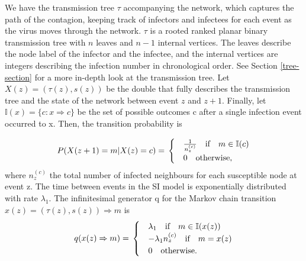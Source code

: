 \documentclass[12pt]{article} %
\numberwithin{equation}{section}
\begin{document}
We have the transmission tree $\tau$ accompanying the network, which captures the path of the contagion, keeping track of infectors and infectees for each event as the virus moves through the network. $\tau$ is a rooted ranked planar binary transmission tree with $n$ leaves and $n-1$ internal vertices. The leaves describe the node label of the infector and the infectee, and the internal vertices are integers describing the infection number in chronological order. See Section \ref{tree-section} for a more in-depth look at the transmission tree. Let $X(z) = (\tau(z),s(z))$ be the double that fully describes the transmission tree and the state of the network between event $z$ and $z+1$. Finally, let $\mathbb{I}(x) = \{c: x \Rightarrow  c\}$ be the set of possible outcomes c after a single infection event occurred to x.  Then, the transition probability is 

\begin{equation} \label{firstP}
P(X(z+1) = m |X(z)= c) = \\
\begin{cases}
& \frac{1}{n_z^{(c)}}  \quad \text{if} \quad m \in \mathbb{I}(c) \\
& 0 \quad \text{otherwise,}
\end{cases}
\end{equation}
where $n_z^{(c)}$ the total number of infected neighbours for each susceptible node at event z. The time between events in the SI model is exponentially distributed with rate $\lambda_1$. The infinitesimal generator q for the Markov chain transition $x(z) = (\tau(z),s(z)) \Rightarrow m$ is
\begin{equation}\label{trans1}
q(x(z) \Rightarrow m) = \\
\begin{cases}
& \lambda_1   \quad \text{if} \quad m \in \mathbb{I}(x(z)) \\ 
& -\lambda_1 n_z^{(c)} \quad \text{if} \quad m = x(z)\\
& 0 \quad \text{otherwise.}
\end{cases}
\end{equation}
\end{document}
